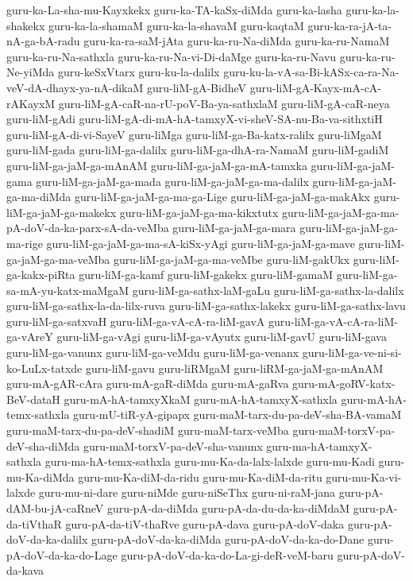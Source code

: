 {guru-ka-La-sha-mu-Kayxkekx
guru-ka-TA-kaSx-diMda
guru-ka-lasha
guru-ka-la-shakekx
guru-ka-la-shamaM
guru-ka-la-shavaM
guru-kaqtaM
guru-ka-ra-jA-ta-nA-ga-bA-radu
guru-ka-ra-saM-jAta
guru-ka-ru-Na-diMda
guru-ka-ru-NamaM
guru-ka-ru-Na-sathxla
guru-ka-ru-Na-vi-Di-daMge
guru-ka-ru-Navu
guru-ka-ru-Ne-yiMda
guru-keSxVtarx
guru-ku-la-dalilx
guru-ku-la-vA-sa-Bi-kASx-ca-ra-Na-veV-dA-dhayx-ya-nA-dikaM
guru-liM-gA-BidheV
guru-liM-gA-Kayx-mA-cA-rAKayxM
guru-liM-gA-caR-na-rU-poV-Ba-ya-sathxlaM
guru-liM-gA-caR-neya
guru-liM-gAdi
guru-liM-gA-di-mA-hA-tamxyX-vi-sheV-SA-nu-Ba-va-sithxtiH
guru-liM-gA-di-vi-SayeV
guru-liMga
guru-liM-ga-Ba-katx-ralilx
guru-liMgaM
guru-liM-gada
guru-liM-ga-dalilx
guru-liM-ga-dhA-ra-NamaM
guru-liM-gadiM
guru-liM-ga-jaM-ga-mAnAM
guru-liM-ga-jaM-ga-mA-tamxka
guru-liM-ga-jaM-gama
guru-liM-ga-jaM-ga-mada
guru-liM-ga-jaM-ga-ma-dalilx
guru-liM-ga-jaM-ga-ma-diMda
guru-liM-ga-jaM-ga-ma-ga-Lige
guru-liM-ga-jaM-ga-makAkx
guru-liM-ga-jaM-ga-makekx
guru-liM-ga-jaM-ga-ma-kikxtutx
guru-liM-ga-jaM-ga-ma-pA-doV-da-ka-parx-sA-da-veMba
guru-liM-ga-jaM-ga-mara
guru-liM-ga-jaM-ga-ma-rige
guru-liM-ga-jaM-ga-ma-sA-kiSx-yAgi
guru-liM-ga-jaM-ga-mave
guru-liM-ga-jaM-ga-ma-veMba
guru-liM-ga-jaM-ga-ma-veMbe
guru-liM-gakUkx
guru-liM-ga-kakx-piRta
guru-liM-ga-kamf
guru-liM-gakekx
guru-liM-gamaM
guru-liM-ga-sa-mA-yu-katx-maMgaM
guru-liM-ga-sathx-laM-gaLu
guru-liM-ga-sathx-la-dalilx
guru-liM-ga-sathx-la-da-lilx-ruva
guru-liM-ga-sathx-lakekx
guru-liM-ga-sathx-lavu
guru-liM-ga-satxvaH
guru-liM-ga-vA-cA-ra-liM-gavA
guru-liM-ga-vA-cA-ra-liM-ga-vAreY
guru-liM-ga-vAgi
guru-liM-ga-vAyutx
guru-liM-gavU
guru-liM-gava
guru-liM-ga-vanunx
guru-liM-ga-veMdu
guru-liM-ga-venanx
guru-liM-ga-ve-ni-si-ko-LuLx-tatxde
guru-liM-gavu
guru-liRMgaM
guru-liRM-ga-jaM-ga-mAnAM
guru-mA-gAR-cAra
guru-mA-gaR-diMda
guru-mA-gaRva
guru-mA-goRV-katx-BeV-dataH
guru-mA-hA-tamxyXkaM
guru-mA-hA-tamxyX-sathxla
guru-mA-hA-temx-sathxla
guru-mU-tiR-yA-gipapx
guru-maM-tarx-du-pa-deV-sha-BA-vamaM
guru-maM-tarx-du-pa-deV-shadiM
guru-maM-tarx-veMba
guru-maM-torxV-pa-deV-sha-diMda
guru-maM-torxV-pa-deV-sha-vanunx
guru-ma-hA-tamxyX-sathxla
guru-ma-hA-temx-sathxla
guru-mu-Ka-da-lalx-lalxde
guru-mu-Kadi
guru-mu-Ka-diMda
guru-mu-Ka-diM-da-ridu
guru-mu-Ka-diM-da-ritu
guru-mu-Ka-vi-lalxde
guru-mu-ni-dare
guru-niMde
guru-niSeThx
guru-ni-raM-jana
guru-pA-dAM-bu-jA-caRneV
guru-pA-da-diMda
guru-pA-da-du-da-ka-diMdaM
guru-pA-da-tiVthaR
guru-pA-da-tiV-thaRve
guru-pA-dava
guru-pA-doV-daka
guru-pA-doV-da-ka-dalilx
guru-pA-doV-da-ka-diMda
guru-pA-doV-da-ka-do-Dane
guru-pA-doV-da-ka-do-Lage
guru-pA-doV-da-ka-do-La-gi-deR-veM-baru
guru-pA-doV-da-kava
}
